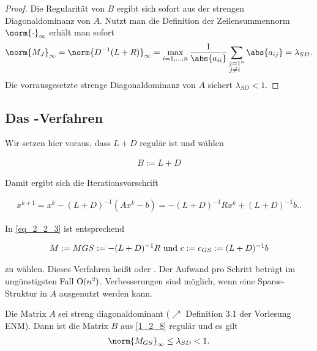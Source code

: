 \begin{proof}
	Die Regularität von $B$ ergibt sich sofort aus der strengen Diagonaldominanz von $A$. Nutzt man die Definition der Zeilensummennorm $\norm{\cdot}_{\infty}$ erhält man sofort
	\begin{align}
		\norm{M_J}_{\infty} = \norm{D^{-1}(L+R)}_{\infty} =\max_{i = 1,\dots,n} \frac{1}{\abs{a_{ii}}} \sum_{\substack{j =1 \\ j\neq i}^{n}} \abs{a_{ij}}  = \lambda_{SD}.\notag
	\end{align}
	Die vorrausgesetzte strenge Diagonaldominanz von $A$ sichert $\lambda_{SD} < 1$.
\end{proof}

\subsection{Das -Verfahren}
Wir setzen hier voraus, dass $L + D$ regulär ist und wählen

\begin{align}
	B := L + D \label{1_2_8}
\end{align}

Damit ergibt sich die Iterationsvorschrift

\begin{align}
	x^{k+1} = x^k - (L+D)^{-1}(Ax^k - b) = - (L+D)^{-1}R x^k + (L+D)^{-1}b. \label{1_2_9}.
\end{align}

In \eqref{eq_2_2_3} ist entsprechend

\begin{align}
	M:= M{GS} := - (L+D)^{-1}R \text{ und } c:= c_{GS} := (L+D)^{-1}b \notag
\end{align}

zu wählen. Dieses Verfahren heißt  oder . Der Aufwand pro Schritt beträgt im ungünstigsten Fall $\operatorname{O}(n^2)$. Verbesserungen sind möglich, wenn eine Sparse-Struktur in $A$ ausgenutzt werden kann.

\begin{proposition}
	Die Matrix $A$ sei streng diagonaldominant ($\nearrow$ Definition 3.1 der Vorlesung ENM). Dann ist die Matrix $B$ aus \eqref{1_2_8} regulär und es gilt
	\begin{align}
		\norm{M_{GS}}_{\infty} \le \lambda_{SD} <1. \notag
	\end{align}
\end{proposition}

